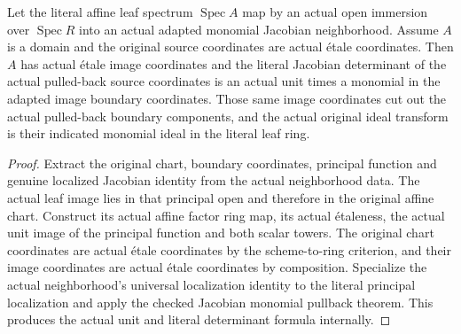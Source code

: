\begin{theorem}\label{thm:sc0-leaf-jacobian-unit-monomial}
\leanok
{}
Let the literal affine leaf spectrum $\operatorname{Spec}A$ map by an actual
open immersion over $\operatorname{Spec}R$ into an actual adapted monomial
Jacobian neighborhood. Assume $A$ is a domain and the original source
coordinates are actual \'etale coordinates. Then $A$ has actual \'etale image
coordinates and the literal Jacobian determinant of the actual pulled-back
source coordinates is an actual unit times a monomial in the adapted image
boundary coordinates.
Those same image coordinates cut out the actual pulled-back boundary
components, and the actual original ideal transform is their indicated
monomial ideal in the literal leaf ring.
\end{theorem}
\begin{proof}
Extract the original chart, boundary coordinates, principal function and
genuine localized Jacobian identity from the actual neighborhood data.
The actual leaf image lies in that principal open and therefore in the
original affine chart. Construct its actual affine factor ring map, its
actual \'etaleness, the actual unit image of the principal function and both
scalar towers. The original chart coordinates are actual \'etale coordinates
by the scheme-to-ring criterion, and their image coordinates are actual
\'etale coordinates by composition. Specialize the actual neighborhood's
universal localization identity to the literal principal localization and
apply the checked Jacobian monomial pullback theorem. This produces the
actual unit and literal determinant formula internally.
\end{proof}
